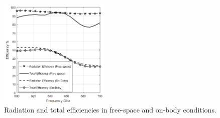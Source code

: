 \documentclass[12pt]{suhbook}
\begin{document}
% 
\begin{figure}[hbt!]
    \centering
    \includegraphics[width=0.47\textwidth]{12}
    \caption{Radiation and total efficiencies in free-space and on-body conditions.}
    \label{Fig 91}
\end{figure}
% 
\end{document}

